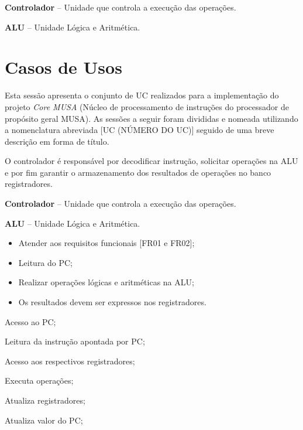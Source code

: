 \documentclass{article}
\begin{document}
\textbf{Controlador} – Unidade que controla a execução das operações.

\textbf{ALU} – Unidade L\'{o}gica e Aritm\'{e}tica.
  
  \section{Casos de Usos}
  Esta sessão apresenta o conjunto de UC realizados para a implementação do projeto \textit{Core MUSA} (Núcleo de processamento de instruções do processador de propósito geral MUSA). As sessões a seguir foram divididas e nomeada utilizando a nomenclatura abreviada [UC (NÚMERO DO UC)] seguido de uma breve descrição em forma de título.

  O controlador é responsável por decodificar instrução, solicitar operações na ALU e por fim garantir o armazenamento dos resultados de operações no banco registradores.
  
  \actors
    \begin{description}
     \item \textbf{Controlador} – Unidade que controla a execução das operações.
     \item \textbf{ALU} – Unidade L\'{o}gica e Aritm\'{e}tica.
    \end{description}
    
  \preconditions 
    \begin{itemize}
     \item Atender aos requisitos funcionais [FR01 e FR02];
     \item Leitura do PC;
     \item Realizar operações lógicas e aritméticas na ALU;
    \end{itemize}

  \postconditions
    \begin{itemize}
     \item Os resultados devem ser expressos nos registradores.
    \end{itemize}
  
  
  \begin{mainflow}
    \item Acesso ao PC;
    \item Leitura da instrução apontada por PC;
    \item Acesso aos respectivos registradores;
    \item Executa operações;
    \item Atualiza registradores;
    \item Atualiza valor do PC;
  \end{mainflow}
  
\end{document}
